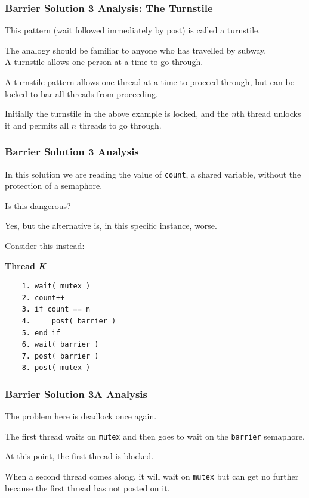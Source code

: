 \begin{frame}
	\frametitle{Barrier Solution 3 Analysis: The Turnstile}

	This pattern (wait followed immediately by post) is called a \alert{turnstile}.

	The analogy should be familiar to anyone who has travelled by subway.\\
	\quad A turnstile allows one person at a time to go through.

	A turnstile pattern allows one thread at a time to proceed through, but can be locked to bar all threads from proceeding.

	Initially the turnstile in the above example is locked, and the $n$th thread unlocks it and permits all $n$ threads to go through.

\end{frame}

\begin{frame}[fragile]
	\frametitle{Barrier Solution 3 Analysis}

	In this solution we are reading the value of \texttt{count}, a shared variable, without the protection of a semaphore.

	Is this dangerous?

	Yes, but the alternative is, in this specific instance, worse.

	Consider this instead:

	\textbf{Thread \textit{K}}\vspace{-2em}
	\begin{verbatim}
	1. wait( mutex )
	2. count++
	3. if count == n
	4.     post( barrier )
	5. end if
	6. wait( barrier )
	7. post( barrier )
	8. post( mutex )
  \end{verbatim}
	\vspace{-2em}

\end{frame}

\begin{frame}
	\frametitle{Barrier Solution 3A Analysis}

	The problem here is deadlock once again.

	The first thread waits on \texttt{mutex} and then goes to wait on the \texttt{barrier} semaphore.

	At this point, the first thread is blocked.

	When a second thread comes along, it will wait on \texttt{mutex} but can get no further because the first thread has not posted on it.


\end{frame}


